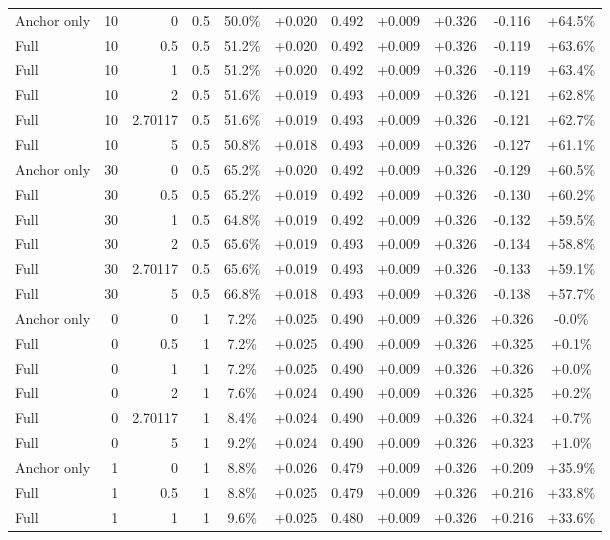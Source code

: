 \begin{table}[htbp]
\begin{tabular}{lrrrccccccc}
Anchor only & 10 & 0 & 0.5 & 50.0\% & +0.020 & 0.492 & +0.009 & +0.326 & -0.116 & +64.5\% \\
Full & 10 & 0.5 & 0.5 & 51.2\% & +0.020 & 0.492 & +0.009 & +0.326 & -0.119 & +63.6\% \\
Full & 10 & 1 & 0.5 & 51.2\% & +0.020 & 0.492 & +0.009 & +0.326 & -0.119 & +63.4\% \\
Full & 10 & 2 & 0.5 & 51.6\% & +0.019 & 0.493 & +0.009 & +0.326 & -0.121 & +62.8\% \\
Full & 10 & 2.70117 & 0.5 & 51.6\% & +0.019 & 0.493 & +0.009 & +0.326 & -0.121 & +62.7\% \\
Full & 10 & 5 & 0.5 & 50.8\% & +0.018 & 0.493 & +0.009 & +0.326 & -0.127 & +61.1\% \\
Anchor only & 30 & 0 & 0.5 & 65.2\% & +0.020 & 0.492 & +0.009 & +0.326 & -0.129 & +60.5\% \\
Full & 30 & 0.5 & 0.5 & 65.2\% & +0.019 & 0.492 & +0.009 & +0.326 & -0.130 & +60.2\% \\
Full & 30 & 1 & 0.5 & 64.8\% & +0.019 & 0.492 & +0.009 & +0.326 & -0.132 & +59.5\% \\
Full & 30 & 2 & 0.5 & 65.6\% & +0.019 & 0.493 & +0.009 & +0.326 & -0.134 & +58.8\% \\
Full & 30 & 2.70117 & 0.5 & 65.6\% & +0.019 & 0.493 & +0.009 & +0.326 & -0.133 & +59.1\% \\
Full & 30 & 5 & 0.5 & 66.8\% & +0.018 & 0.493 & +0.009 & +0.326 & -0.138 & +57.7\% \\
Anchor only & 0 & 0 & 1 & 7.2\% & +0.025 & 0.490 & +0.009 & +0.326 & +0.326 & -0.0\% \\
Full & 0 & 0.5 & 1 & 7.2\% & +0.025 & 0.490 & +0.009 & +0.326 & +0.325 & +0.1\% \\
Full & 0 & 1 & 1 & 7.2\% & +0.025 & 0.490 & +0.009 & +0.326 & +0.326 & +0.0\% \\
Full & 0 & 2 & 1 & 7.6\% & +0.024 & 0.490 & +0.009 & +0.326 & +0.325 & +0.2\% \\
Full & 0 & 2.70117 & 1 & 8.4\% & +0.024 & 0.490 & +0.009 & +0.326 & +0.324 & +0.7\% \\
Full & 0 & 5 & 1 & 9.2\% & +0.024 & 0.490 & +0.009 & +0.326 & +0.323 & +1.0\% \\
Anchor only & 1 & 0 & 1 & 8.8\% & +0.026 & 0.479 & +0.009 & +0.326 & +0.209 & +35.9\% \\
Full & 1 & 0.5 & 1 & 8.8\% & +0.025 & 0.479 & +0.009 & +0.326 & +0.216 & +33.8\% \\
Full & 1 & 1 & 1 & 9.6\% & +0.025 & 0.480 & +0.009 & +0.326 & +0.216 & +33.6\% \\

\end{tabular}
\end{table}
